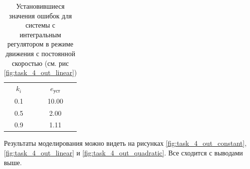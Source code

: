 \begin{table}[H]
    \centering
    \caption{Установившиеся значения ошибок для системы с интегральным регулятором в режиме движения с постоянной скоростью (см. рис \ref{fig:task_4_out_linear})}
    \begin{tabular}{|c|c|}
        \hline
        $k_i$ & $e_\text{уст}$\\[2mm]
        0.1 & 10.00 \\[2mm]
        0.5 & 2.00 \\[2mm]
        0.9 & 1.11 \\[2mm]
        \hline
    \end{tabular}
    \label{tab:task_4_out}
\end{table}
Результаты моделирования можно видеть на рисунках \ref{fig:task_4_out_constant}, 
\ref{fig:task_4_out_linear} и \ref{fig:task_4_out_quadratic}. Все сходится с выводами выше.

